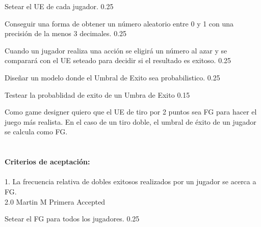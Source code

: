 		{Setear el UE de cada jugador.} %
		{} %
		{0.25} %
		{} %
		{} %
		{} %

		{Conseguir una forma de obtener un número aleatorio entre 0 y 1 con una precisión de la menos 3 decimales.} %
		{} %
		{0.25} %
		{} %
		{} %
		{} %

		{Cuando un jugador realiza una acción se eligirá un número al azar y se comparará con el UE seteado para decidir si el resultado es exitoso.} %
		{} %
		{0.25} %
		{} %
		{} %
		{} %

		{Diseñar un modelo donde el Umbral de Exito sea probabilistico.} %
		{} %
		{0.25} %
		{} %
		{} %
		{} %

		{Testear la probablidad de exito de un Umbra de Exito} %
		{} %
		{0.15} %
		{} %
		{} %
		{} %


\vspace{20pt}

	{Como game designer quiero que el UE de tiro por 2 puntos sea FG para hacer el juego m\'as realista.} %
	{En el caso de un tiro doble, el umbral de éxito de un jugador se calcula como FG. \\
  \\
  \\
\textbf{Criterios de aceptación:}\\
  \\
1. La frecuencia relativa de dobles exitosos realizados por un jugador se acerca a FG. \\

} %
	{} %
	{2.0} %
	{Martin M} %
	{Primera} %
	{Accepted} %

		{Setear el FG para todos los jugadores.} %
		{} %
		{0.25} %
		{} %
		{} %
		{} %

